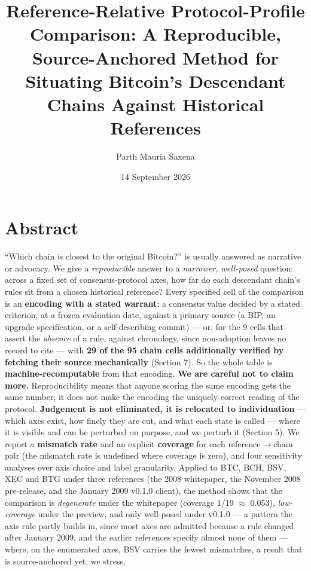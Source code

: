\documentclass[
]{article}
\title{Reference-Relative Protocol-Profile Comparison: A Reproducible,
Source-Anchored Method for Situating Bitcoin's Descendant Chains Against
Historical References}
\author{Parth Mauria Saxena}
\date{14 September 2026}
\newcounter{none} %
\begin{document}
\maketitle

\section{Abstract}\label{abstract}

``Which chain is closest to the original Bitcoin?'' is usually answered
as narrative or advocacy. We give a \emph{reproducible} answer to a
\emph{narrower, well-posed} question: across a fixed set of
consensus-protocol axes, how far do each descendant chain's rules sit
from a chosen historical reference? Every specified cell of the
comparison is an \textbf{encoding with a stated warrant}: a consensus
value decided by a stated criterion, at a frozen evaluation date,
against a primary source (a BIP, an upgrade specification, or a
self-describing commit) --- or, for the 9 cells that assert the
\emph{absence} of a rule, against chronology, since non-adoption leaves
no record to cite --- with \textbf{29 of the 95 chain cells additionally
verified by fetching their source mechanically} (Section 7). So the
whole table is \textbf{machine-recomputable} from that encoding.
\textbf{We are careful not to claim more.} Reproducibility means that
anyone scoring the same encoding gets the same number; it does not make
the encoding the uniquely correct reading of the protocol.
\textbf{Judgement is not eliminated, it is relocated to individuation}
--- which axes exist, how finely they are cut, and what each state is
called --- where it is visible and can be perturbed on purpose, and we
perturb it (Section 5). We report a \textbf{mismatch rate} and an
explicit \textbf{coverage} for each reference\(\rightarrow\)chain pair
(the mismatch rate is undefined where coverage is zero), and four
sensitivity analyses over axis choice and label granularity. Applied to
BTC, BCH, BSV, XEC and BTG under three references (the 2008 whitepaper,
the November 2008 pre-release, and the January 2009 v0.1.0 client), the
method shows that the comparison is \emph{degenerate} under the
whitepaper (coverage 1/19 \(\approx\) 0.053), \emph{low-coverage} under
the preview, and only well-posed under v0.1.0 --- a pattern the axis
rule partly builds in, since most axes are admitted because a rule
changed after January 2009, and the earlier references specify almost
none of them --- where, on the enumerated axes, BSV carries the fewest
mismatches, a result that is source-anchored yet, we stress,
\end{document}
